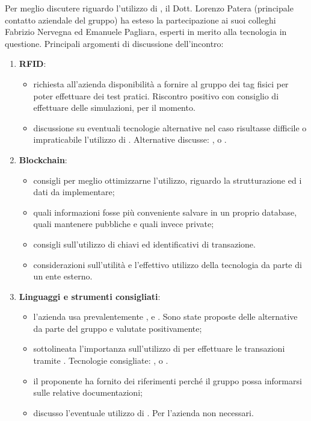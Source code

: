 Per meglio discutere riguardo l'utilizzo di ,  il Dott. Lorenzo Patera (principale contatto aziendale del gruppo) ha esteso la partecipazione ai suoi colleghi Fabrizio Nervegna ed Emanuele Pagliara, esperti in merito alla tecnologia in questione.
Principali argomenti di discussione dell'incontro:
\begin{enumerate}
    \item \textbf{RFID}:
        \begin{itemize}
            \item richiesta all'azienda disponibilità a fornire al gruppo dei tag fisici per poter effettuare dei test pratici. Riscontro positivo con consiglio di effettuare delle simulazioni, per il momento.
            \item discussione su eventuali tecnologie alternative nel caso risultasse difficile o impraticabile l'utilizzo di . Alternative discusse: ,  o .
        \end{itemize}
    \item \textbf{Blockchain}:
        \begin{itemize}
            \item consigli per meglio ottimizzarne l'utilizzo, riguardo la strutturazione ed i dati da implementare;
            \item quali informazioni fosse più conveniente salvare in un proprio database, quali mantenere pubbliche e quali invece private; 
            \item consigli sull'utilizzo di chiavi  ed identificativi di transazione.
            \item considerazioni sull'utilità e l'effettivo utilizzo della tecnologia da parte di un ente esterno.
        \end{itemize}
    \item \textbf{Linguaggi e strumenti consigliati}:\\
        \begin{itemize}
            \item l'azienda usa prevalentemente ,  e . Sono state proposte delle alternative da parte del gruppo e valutate positivamente;
            \item sottolineata l'importanza sull'utilizzo di  per effettuare le transazioni tramite . Tecnologie consigliate: ,  o .
            \item il proponente ha fornito dei riferimenti perché il gruppo possa informarsi sulle relative documentazioni;
            \item discusso l'eventuale utilizzo di . Per l'azienda non necessari.
        \end{itemize}
\end{enumerate}
